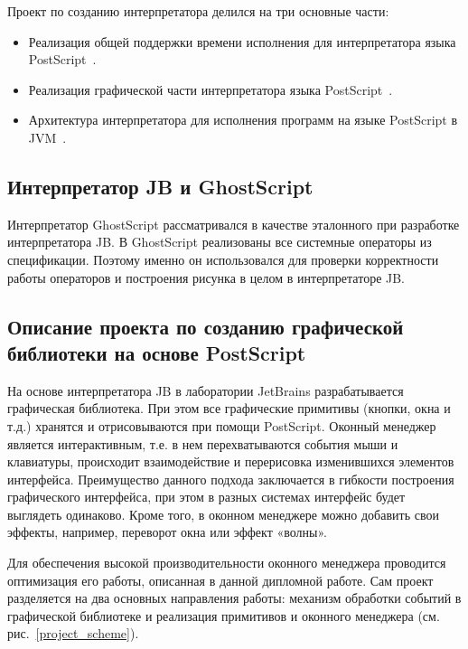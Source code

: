 \documentclass[14pt]{extarticle}
\begin{document}
	Проект по созданию интерпретатора делился на три основные части:
	\begin{itemize}
		\item Реализация общей поддержки времени исполнения для интерпретатора языка PostScript~\cite{runtime}.
		\item Реализация графической части интерпретатора языка PostScript~\cite{graphic}.
		\item Архитектура интерпретатора для исполнения программ на языке PostScript в JVM~\cite{architecture}.
	\end{itemize}

		
	 
	\subsection{Интерпретатор JB и GhostScript}
	Интерпретатор GhostScript рассматривался в качестве эталонного при разработке интерпретатора JB. В GhostScript реализованы все системные операторы из спецификации. Поэтому именно он использовался для проверки корректности работы операторов и построения рисунка в целом в интерпретаторе JB.
		
	
	\subsection{Описание проекта по созданию графической \\ библиотеки на основе PostScript}	
	На основе интерпретатора JB  в лаборатории JetBrains разрабатывается графическая библиотека. При этом все графические примитивы (кнопки, окна и т.д.) хранятся и отрисовываются при помощи PostScript. Оконный менеджер является интерактивным, т.е. в нем перехватываются события мыши и клавиатуры, происходит взаимодействие и перерисовка изменившихся элементов интерфейса.  Преимущество данного подхода заключается в гибкости построения графического интерфейса, при этом в разных системах интерфейс будет выглядеть одинаково. Кроме того, в оконном менеджере можно добавить свои эффекты, например, переворот окна или эффект «волны».
	
	Для обеспечения высокой производительности оконного менеджера проводится оптимизация его работы, описанная в данной дипломной работе. Сам проект разделяется на два основных направления работы: механизм обработки событий в графической библиотеке и реализация примитивов и оконного менеджера (см. рис.~\ref{project_scheme}). 
	
\end{document}
